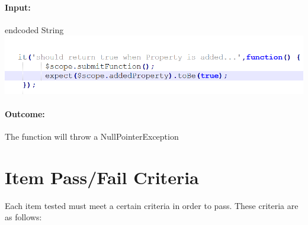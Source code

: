 \documentclass[a4paper,12pt]{article}
\begin{document}
\paragraph{Input:} endcoded String\\
\includegraphics[width=1\textwidth]{./Images/input6.png}

\paragraph{Outcome: } The function will throw a NullPointerException


\section{Item Pass/Fail Criteria}
Each item tested must meet a certain criteria in order to pass. These criteria are as follows:\\
\end{document}
